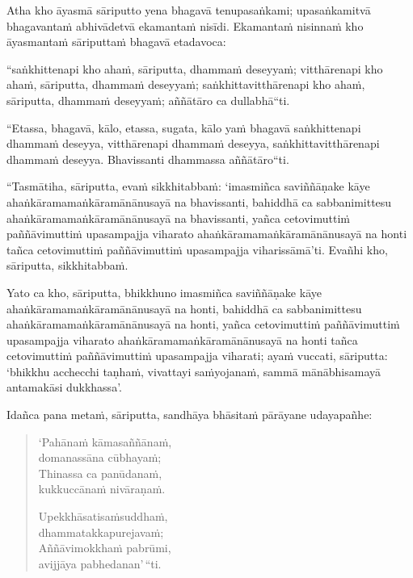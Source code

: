 Atha kho āyasmā sāriputto yena bhagavā tenupasaṅkami; upasaṅkamitvā bhagavantaṁ abhivādetvā ekamantaṁ nisīdi. Ekamantaṁ nisinnaṁ kho āyasmantaṁ sāriputtaṁ bhagavā etadavoca:

``saṅkhittenapi kho ahaṁ, sāriputta, dhammaṁ deseyyaṁ; vitthārenapi kho ahaṁ, sāriputta, dhammaṁ deseyyaṁ; saṅkhittavitthārenapi kho ahaṁ, sāriputta, dhammaṁ deseyyaṁ; aññātāro ca dullabhā``ti.

``Etassa, bhagavā, kālo, etassa, sugata, kālo yaṁ bhagavā saṅkhittenapi dhammaṁ deseyya, vitthārenapi dhammaṁ deseyya, saṅkhittavitthārenapi dhammaṁ deseyya. Bhavissanti dhammassa aññātāro``ti.

``Tasmātiha, sāriputta, evaṁ sikkhitabbaṁ: `imasmiñca saviññāṇake kāye ahaṅkāramamaṅkāramānānusayā na bhavissanti, bahiddhā ca sabbanimittesu ahaṅkāramamaṅkāramānānusayā na bhavissanti, yañca cetovimuttiṁ paññāvimuttiṁ upasampajja viharato ahaṅkāramamaṅkāramānānusayā na honti tañca cetovimuttiṁ paññāvimuttiṁ upasampajja viharissāmā'ti. Evañhi kho, sāriputta, sikkhitabbaṁ.

Yato ca kho, sāriputta, bhikkhuno imasmiñca saviññāṇake kāye ahaṅkāramamaṅkāramānānusayā na honti, bahiddhā ca sabbanimittesu ahaṅkāramamaṅkāramānānusayā na honti, yañca cetovimuttiṁ paññāvimuttiṁ upasampajja viharato ahaṅkāramamaṅkāramānānusayā na honti tañca cetovimuttiṁ paññāvimuttiṁ upasampajja viharati; ayaṁ vuccati, sāriputta: `bhikkhu acchecchi taṇhaṁ, vivattayi saṁyojanaṁ, sammā mānābhisamayā antamakāsi dukkhassa'.

Idañca pana metaṁ, sāriputta, sandhāya bhāsitaṁ pārāyane udayapañhe:

\begin{quote}
`Pahānaṁ kāmasaññānaṁ,\\
domanassāna cūbhayaṁ;\\
Thinassa ca panūdanaṁ,\\
kukkuccānaṁ nivāraṇaṁ.

Upekkhāsatisaṁsuddhaṁ,\\
dhammatakkapurejavaṁ;\\
Aññāvimokkhaṁ pabrūmi,\\
avijjāya pabhedanan'\,``ti.
\end{quote}
